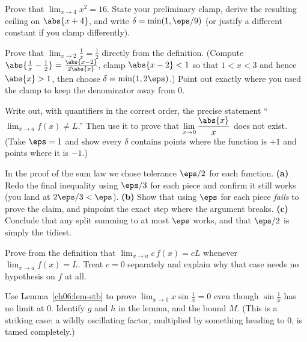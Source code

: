 \begin{exercise}
Prove that $\displaystyle\lim_{x\to 4}x^2=16$. State your preliminary clamp,
derive the resulting ceiling on $\abs{x+4}$, and write
$\delta=\min(1,\eps/9)$ (or justify a different constant if you clamp
differently).
\end{exercise}

\begin{exercise}[A reciprocal]
Prove that $\displaystyle\lim_{x\to 2}\frac{1}{x}=\frac12$ directly from the
definition. (Compute $\abs{\frac1x-\frac12}=\frac{\abs{x-2}}{2\abs{x}}$, clamp
$\abs{x-2}<1$ so that $1<x<3$ and hence $\abs{x}>1$, then choose
$\delta=\min(1,2\eps)$.) Point out exactly where you used the clamp to keep the
denominator away from $0$.
\end{exercise}

\begin{exercise}
Write out, with quantifiers in the correct order, the precise statement
``$\lim_{x\to a}f(x)\ne L$.'' Then use it to prove that
$\displaystyle\lim_{x\to 0}\frac{\abs{x}}{x}$ does not exist. (Take $\eps=1$ and
show every $\delta$ contains points where the function is $+1$ and points where
it is $-1$.)
\end{exercise}

\begin{exercise}
In the proof of the sum law we chose tolerance $\eps/2$ for each function.
\textbf{(a)} Redo the final inequality using $\eps/3$ for each piece and confirm
it still works (you land at $2\eps/3<\eps$). \textbf{(b)} Show that using $\eps$
for each piece \emph{fails} to prove the claim, and pinpoint the exact step where
the argument breaks. \textbf{(c)} Conclude that any split summing to at most
$\eps$ works, and that $\eps/2$ is simply the tidiest.
\end{exercise}

\begin{exercise}
Prove from the definition that $\displaystyle\lim_{x\to a}c\,f(x)=cL$ whenever
$\lim_{x\to a}f(x)=L$. Treat $c=0$ separately and explain why that case needs no
hypothesis on $f$ at all.
\end{exercise}

\begin{exercise}
Use Lemma~\ref{ch06:lem-stb} to prove $\displaystyle\lim_{x\to0}x\sin\frac1x=0$
even though $\sin\frac1x$ has no limit at $0$. Identify $g$ and $h$ in the lemma,
and the bound $M$. (This is a striking case: a wildly oscillating factor,
multiplied by something heading to $0$, is tamed completely.)
\end{exercise}

